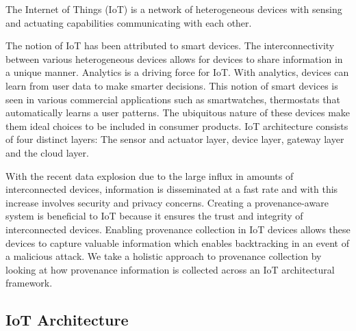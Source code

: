 \begin{definition}
The Internet of Things (IoT) is a network of heterogeneous devices with sensing and actuating capabilities communicating with each other. 

\end{definition}

The notion of IoT has been attributed to smart devices. The interconnectivity between various heterogeneous devices allows for devices to share information in a unique manner. Analytics is a driving force for IoT. With analytics, devices can learn from user data to make smarter decisions. This notion of smart devices is seen in various commercial applications such as smartwatches, thermostats that automatically learns a user patterns. The ubiquitous nature of these devices make them ideal choices to be included in consumer products. IoT architecture consists of four distinct layers: The sensor and actuator layer, device layer, gateway layer and the cloud layer. 

\par With the recent data explosion \cite{emc_bigdata} due to the large influx in amounts of interconnected devices, information is disseminated at a fast rate and with this increase involves security and privacy concerns. Creating a provenance-aware system is beneficial to IoT because it ensures the trust and  integrity of interconnected devices. Enabling provenance collection in IoT devices allows these devices to capture valuable information which enables backtracking in an event of a malicious attack. We take a holistic approach to provenance collection by looking at how provenance information is collected across an IoT architectural framework.

 
  \subsection{IoT Architecture}

